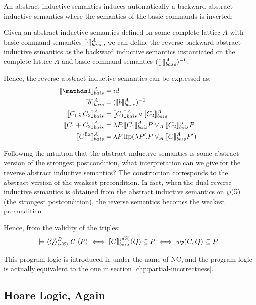 \documentclass[
  10pt,       %
  twoside,    %
  a4paper,    %
  english,    %
  tikz,       %
  openright,  %
]{book}
\begin{document}
An abstract inductive semantics induces automatically a backward abstract
inductive semantics where the semantics of the basic commands is inverted:

\begin{definition}
  Given an abstract inductive semantics defined on some complete lattice $A$
  with basic command semantics $\bsem{\cdot}^A$, we can define the reverse
  backward abstract inductive semantics as the backward inductive semantics
  instantiated on the complete lattice $A$ and basic command semantics
  $(\bsem{\cdot}^A)^{-1}$.
\end{definition}

Hence, the reverse abstract inductive semantics can be expressed as:
\begin{align*}
  \asemback{\sskip}        &= id \\
  \asemback{b}             &= (\bsem{b}^A)^{-1} \\
  \asemback{C_1 \fcmp C_2} &= \asemback{C_1} \circ \asemback{C_2} \\
  \asemback{C_1 + C_2}     &= \lambda P . \asemback{C_1} P \join_A \asemback{C_2} P \\
  \asemback{C^\fix}        &= \lambda P . \lfp(\lambda P'. P \join_A \asemback{C} P')
\end{align*}

Following the intuition that the abstract inductive semantics is some abstract
version of the strongest postcondition, what interpretation can we give for the
reverse abstract inductive semantics? The construction corresponds to the
abstract version of the weakest precondition. In fact, when the dual reverse
inductive semantics is obtained from the abstract inductive semantics on
$\pow{\states}$ (the strongest postcondition), the reverse semantics becomes
the weakest precondition.

Hence, from the validity of the triples: $$\models
\atripleback[\pow{\states}]{Q}{C}{P} \iff \asemback[\pow{\states}]{C}(Q)
\subseteq P \iff wp(C, Q) \subseteq P$$

This program logic is introduced in \cite{Ascari24} under the name of NC, and
the program logic is actually equivalent to the one in section
\ref{chp:partial-incorrectness}.

\subsection{Hoare Logic, Again}
\end{document}
